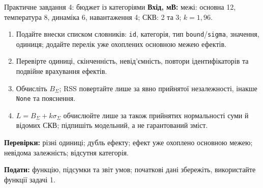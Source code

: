\documentclass[aspectratio=169,11pt]{beamer}
\begin{document}
\begin{frame}{Практичне завдання 4: бюджет із категоріями}
\small
\textbf{Вхід, мВ:} межі: основна 12, температура 8, динаміка 6, навантаження 4; СКВ: 2 та 3; $k=1{,}96$.
\begin{enumerate}
\item Подайте внески списком словників: \texttt{id}, категорія, тип \texttt{bound}/\texttt{sigma}, значення, одиниця; додайте перелік уже охоплених основною межею ефектів.
\item Перевірте одиниці, скінченність, невід’ємність, повтори ідентифікаторів та подвійне врахування ефектів.
\item Обчисліть $B_\Sigma$; RSS повертайте лише за явно прийнятої незалежності, інакше \texttt{None} та пояснення.
\item $L=B_\Sigma+k\sigma_\Sigma$ обчислюйте лише за також прийнятих нормальності суми й відомих СКВ; підпишіть модельний, а не гарантований зміст.
\end{enumerate}
\textbf{Перевірки:} різні одиниці; дубль ефекту; ефект уже охоплено основною межею; невідома залежність; відсутня категорія.
\medskip

\textbf{Подати:} функцію, підсумки та звіт умов; початкові дані збережіть, використайте функції задачі 1.
\end{frame}
\end{document}
